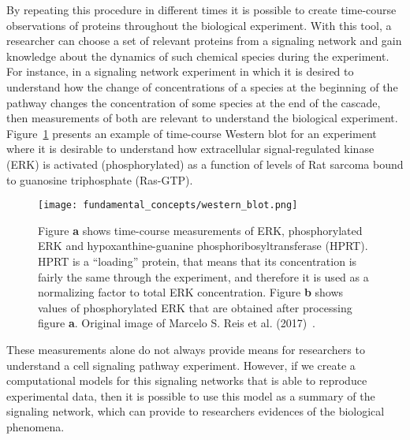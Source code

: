 By repeating this procedure in different times it is possible to create 
time-course observations of proteins throughout the biological 
experiment. With this tool, a researcher can choose a set of relevant 
proteins from a signaling network and gain knowledge about the dynamics 
of such chemical species during the experiment. For instance, in a 
signaling network experiment in which it is desired to understand how
the change of concentrations of a species at the beginning of the 
pathway changes the concentration of some species at the end of the 
cascade, then measurements of both are relevant to understand the 
biological experiment. Figure~\ref{fig:western_blot_example} presents an 
example of time-course Western blot for an experiment where it is 
desirable to understand how extracellular signal-regulated kinase (ERK)
is activated (phosphorylated) as a function of levels of Rat sarcoma
bound to guanosine triphosphate (Ras-GTP).

\begin{figure}[!ht]
\centering
    \texttt{[image: fundamental\_concepts/western\_blot.png]}
    \caption{Figure {\bf a} shows time-course measurements of ERK, 
    phosphorylated ERK and hypoxanthine-guanine 
    phosphoribosyltransferase (HPRT). HPRT is a ``loading'' protein, 
    that means that its concentration is fairly the same through the 
    experiment, and therefore it is used as a normalizing factor to 
    total ERK concentration. Figure  {\bf b} shows values of 
    phosphorylated ERK that are obtained after processing figure 
    {\bf a}. Original image of Marcelo S. Reis et al. 
    (2017)~\cite{Reis2017}.}
    \label{fig:western_blot_example}
\end{figure}

These measurements alone do not always provide means for researchers to 
understand a cell signaling pathway experiment. However, if we create a 
computational models for this signaling networks that is able to 
reproduce experimental data, then it is possible to use this model as a 
summary of the signaling network, which can provide to researchers 
evidences of the biological phenomena.



